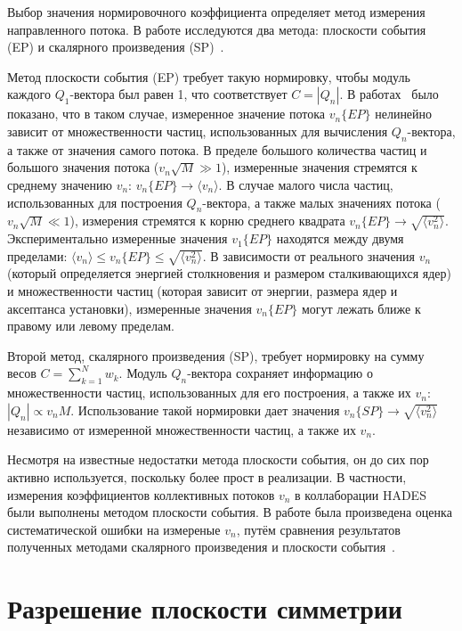 Выбор значения нормировочного коэффициента определяет метод измерения направленного потока. 
В работе исследуются два метода: плоскости события (EP) и скалярного произведения (SP)~\cite{Mamaev:2020lpi}. 

Метод плоскости события (EP) требует такую нормировку, чтобы модуль каждого $Q_1$-вектора был равен 1, что соответствует $C=|Q_n|$. 
В работах~\cite{Borghini:2001vi, Bhalerao:2006tp} было показано, что в таком случае, измеренное значение потока $v_n\{EP\}$ нелинейно зависит от множественности частиц, использованных для вычисления $Q_n$-вектора, а также от значения самого потока. 
В пределе большого количества частиц и большого значения потока ($v_n \sqrt{M} \gg 1$), измеренные значения стремятся к среднему значению $v_n$: $v_n\{EP\} \xrightarrow{} \langle v_n \rangle$. 
В случае малого числа частиц, использованных для построения $Q_n$-вектора, а также малых значениях потока ($v_n \sqrt{M} \ll 1$), измерения стремятся к корню среднего квадрата $ v_n\{EP\} \xrightarrow{} \sqrt{ \langle v_n^2 \rangle }$.
Экспериментально измеренные значения $v_1\{EP\}$ находятся между двумя пределами: $ \langle v_n \rangle \leq v_n\{EP\} \leq \sqrt{ \langle v_n^2 \rangle } $.
В зависимости от реального значения $v_n$ (который определяется энергией столкновения и размером сталкивающихся ядер) и множественности частиц (которая зависит от энергии, размера ядер и аксептанса установки), измеренные значения $v_n\{EP\}$ могут лежать ближе к правому или левому пределам.

Второй метод, скалярного произведения (SP), требует нормировку на сумму весов $C=\sum_{k=1}^N w_k$.
Модуль $Q_n$-вектора сохраняет информацию о множественности частиц, использованных для его построения, а также их $v_n$: $|Q_n| \propto v_n M$.
Использование такой нормировки дает значения $v_n\{SP\} \xrightarrow{} \sqrt{\langle v_n^2 \rangle}$ независимо от измеренной множественности частиц, а также их $v_n$.

Несмотря на известные недостатки метода плоскости события, он до сих пор активно используется, поскольку более прост в реализации. 
В частности, измерения коэффициентов коллективных потоков $v_n$ в коллаборации HADES~\cite{HADES:2020lob} были выполнены методом плоскости события. 
В работе была произведена оценка систематической ошибки на измереные $v_n$, путём сравнения результатов полученных методами скалярного произведения и плоскости события~\cite{Mamaev:2020lpi}.

\section{Разрешение плоскости симметрии}

